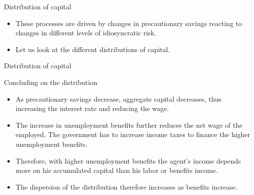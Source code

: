 \documentclass{beamer}
\begin{document}
	
\begin{frame}{Distribution of capital}
	\begin{itemize}
	
	\item {
These processes are driven by changes in precautionary savings reacting to changes in different levels of idiosyncratic risk. 
	}
	\item {
Let us look at the different distributions of capital. 
	}

	\end{itemize} 
\end{frame}



\begin{frame}{Distribution of capital}

\end{frame}


\begin{frame}{Concluding on the distribution}

\begin{itemize} 


	\item {
As precautionary savings decrease, aggregate capital decreases, thus increasing the interest rate and reducing the wage. 
}
	\item {
The increase in unemployment benefits further reduces the net wage of the employed. The government has to increase income taxes to finance the higher unemployment benefits.
}
	\item {
Therefore, with higher unemployment benefits the agent's income depends more on his accumulated capital than his labor or benefits income. 
}
	\item {
The dispersion of the distribution therefore increases as benefits increase.
}


\end{itemize}

\end{frame}
\end{document}
